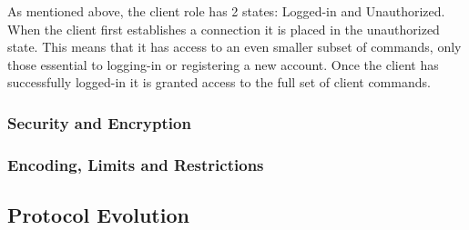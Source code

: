 As mentioned above, the client role has 2 states: Logged-in and Unauthorized. When the client first establishes a connection it is placed in the unauthorized state. This means that it has access to an even smaller subset of commands, only those essential to logging-in or registering a new account. Once the client has successfully logged-in it is granted access to the full set of client commands.

\subsubsection{Security and Encryption}

\subsubsection{Encoding, Limits and Restrictions}

\subsection{Protocol Evolution}

